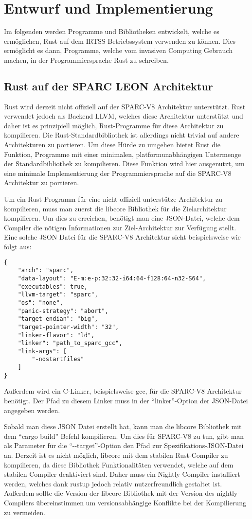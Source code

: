 \chapter{Entwurf und Implementierung}\label{sec:impl}

Im folgenden werden Programme und Bibliotheken entwickelt, welche es ermöglichen, Rust auf dem IRTSS Betriebssystem
verwenden zu können. Dies ermöglicht es dann, Programme, welche vom invasiven Computing Gebrauch machen, in der
Programmiersprache Rust zu schreiben.

\section{Rust auf der SPARC LEON Architektur}

Rust wird derzeit nicht offiziell auf der SPARC-V8 Architektur unterstützt. Rust verwendet jedoch als Backend LLVM,
welches diese Architektur unterstützt und daher ist es prinzipiell möglich, Rust-Programme für diese Architektur zu kompilieren.
Die Rust-Standardbibliothek ist allerdings nicht trivial auf andere Architekturen zu portieren.
Um diese Hürde zu umgehen bietet Rust die Funktion,
Programme mit einer minimalen, platformunabhängigen Untermenge der Standardbibliothek zu kompilieren. Diese Funktion wird hier
ausgenutzt, um eine minimale Implementierung der Programmiersprache auf die SPARC-V8 Architektur zu portieren.

Um ein Rust Programm für eine nicht offiziell unterstütze Architektur zu kompilieren, muss man zuerst die libcore Bibliothek
für die Zielarchitektur kompilieren. Um dies zu erreichen, benötigt man eine JSON-Datei, welche
dem Compiler die nötigen Informationen zur Ziel-Architektur zur Verfügung stellt. Eine solche JSON Datei für die
SPARC-V8 Architektur sieht beispielsweise wie folgt aus\cite{initialSparcSupportGithub}:
\begin{verbatim}
{
    "arch": "sparc",
    "data-layout": "E-m:e-p:32:32-i64:64-f128:64-n32-S64",
    "executables": true,
    "llvm-target": "sparc",
    "os": "none",
    "panic-strategy": "abort",
    "target-endian": "big",
    "target-pointer-width": "32",
    "linker-flavor": "ld",
    "linker": "path_to_sparc_gcc",
    "link-args": [
        "-nostartfiles"
    ]
}
\end{verbatim}
Außerdem wird ein C-Linker, beispielsweise gcc, für die SPARC-V8 Architektur benötigt. Der Pfad zu diesem Linker
muss in der "`linker"'-Option der JSON-Datei angegeben werden.

Sobald man diese JSON Datei erstellt hat, kann man die libcore Bibliothek mit dem "`cargo build"' Befehl kompilieren.
Um dies für SPARC-V8 zu tun, gibt man als Parameter für die "`-{}-target"'-Option den Pfad zur Spezifikations-JSON-Datei an.
Derzeit ist es nicht möglich, libcore mit dem stabilen Rust-Compiler zu kompilieren, da diese Bibliothek Funktionalitäten
verwendet, welche auf dem stabilen Compiler deaktiviert sind. Daher muss ein Nightly-Compiler installiert werden, welches
dank rustup jedoch relativ nutzerfreundlich gestaltet ist. Außerdem sollte die Version der libcore Bibliothek
mit der Version des nightly-Compilers übereinstimmen um versionsabhängige Konflikte bei der Kompilierung zu vermeiden.

